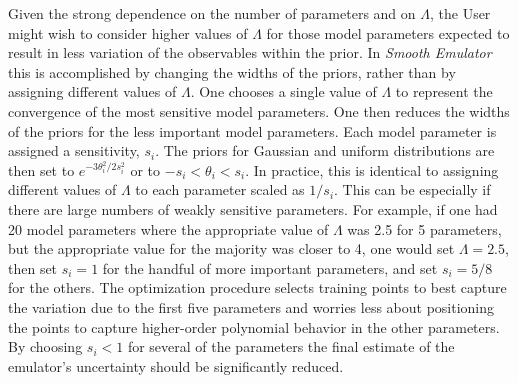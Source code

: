 \documentclass[UserManual.tex]{subfiles}
\begin{document}
Given the strong dependence on the number of parameters and on $\Lambda$, the User might wish to consider higher values of $\Lambda$ for those model parameters expected to result in less variation of the observables within the prior. In {\it Smooth Emulator} this is accomplished by changing the widths of the priors, rather than by assigning different values of $\Lambda$. One chooses a single value of $\Lambda$ to represent the convergence of the most sensitive model parameters. One then reduces the widths of the priors for the less important model parameters. Each model parameter is assigned a sensitivity, $s_i$. The priors for Gaussian and uniform distributions are then set to $e^{-3\theta_i^2/2s_i^2}$ or to $-s_i<\theta_i<s_i$. In practice, this is identical to assigning different values of $\Lambda$ to each parameter scaled as $1/s_i$. This can be especially if there are large numbers of weakly sensitive parameters. For example, if one had 20 model parameters where the appropriate value of $\Lambda$ was 2.5 for 5 parameters, but the appropriate value for the majority was closer to 4, one would set $\Lambda=2.5$, then set $s_i=1$ for the handful of more important parameters, and set $s_i=5/8$ for the others. The optimization procedure selects training points to best capture the variation due to the first five parameters and worries less about positioning the points to capture higher-order polynomial behavior in the other parameters. By choosing $s_i<1$ for several of the parameters the final estimate of the emulator's uncertainty should be significantly reduced.
\end{document}
